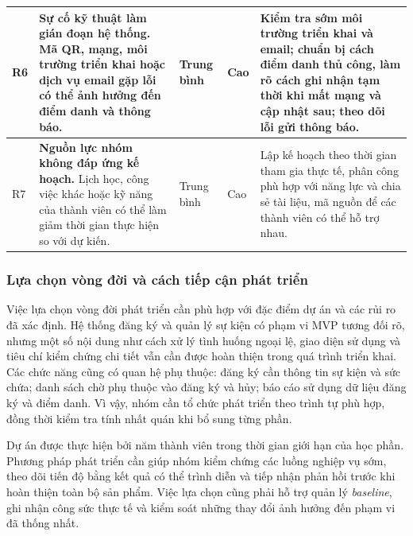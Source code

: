 {\begin{longtable}{|p{0.7cm}|p{5.1cm}|p{1.7cm}|p{1.5cm}|p{5.4cm}|}
\hline
R6 & \textbf{Sự cố kỹ thuật làm gián đoạn hệ thống.} Mã QR, mạng, môi trường triển khai hoặc dịch vụ email gặp lỗi có thể ảnh hưởng đến điểm danh và thông báo. & Trung bình & Cao & Kiểm tra sớm môi trường triển khai và email; chuẩn bị cách điểm danh thủ công, làm rõ cách ghi nhận tạm thời khi mất mạng và cập nhật sau; theo dõi lỗi gửi thông báo. \\
\hline
R7 & \textbf{Nguồn lực nhóm không đáp ứng kế hoạch.} Lịch học, công việc khác hoặc kỹ năng của thành viên có thể làm giảm thời gian thực hiện so với dự kiến. & Trung bình & Cao & Lập kế hoạch theo thời gian tham gia thực tế, phân công phù hợp với năng lực và chia sẻ tài liệu, mã nguồn để các thành viên có thể hỗ trợ nhau. \\
\hline
\end{longtable}
}

\subsubsection{Lựa chọn vòng đời và cách tiếp cận phát triển}


Việc lựa chọn vòng đời phát triển cần phù hợp với đặc điểm dự án và các rủi ro đã xác định. Hệ thống đăng ký và quản lý sự kiện có phạm vi MVP tương đối rõ, nhưng một số nội dung như cách xử lý tình huống ngoại lệ, giao diện sử dụng và tiêu chí kiểm chứng chi tiết vẫn cần được hoàn thiện trong quá trình triển khai. Các chức năng cũng có quan hệ phụ thuộc: đăng ký cần thông tin sự kiện và sức chứa; danh sách chờ phụ thuộc vào đăng ký và hủy; báo cáo sử dụng dữ liệu đăng ký và điểm danh. Vì vậy, nhóm cần tổ chức phát triển theo trình tự phù hợp, đồng thời kiểm tra tính nhất quán khi bổ sung từng phần.

Dự án được thực hiện bởi năm thành viên trong thời gian giới hạn của học phần. Phương pháp phát triển cần giúp nhóm kiểm chứng các luồng nghiệp vụ sớm, theo dõi tiến độ bằng kết quả có thể trình diễn và tiếp nhận phản hồi trước khi hoàn thiện toàn bộ sản phẩm. Việc lựa chọn cũng phải hỗ trợ quản lý \textit{baseline}, ghi nhận công sức thực tế và kiểm soát những thay đổi ảnh hưởng đến phạm vi đã thống nhất.


